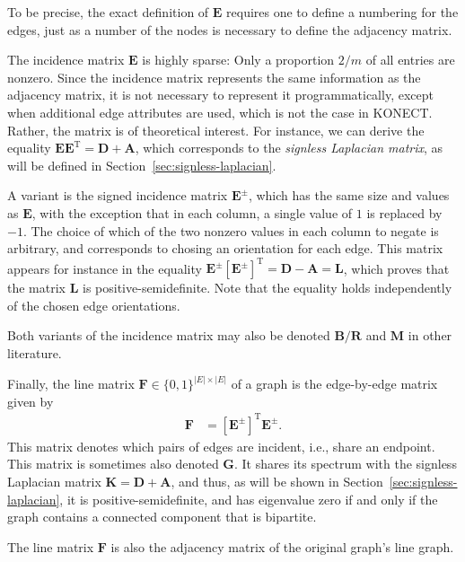 \documentclass{article}
\begin{document}
To be precise, the exact definition of $\mathbf E$ requires one to
define a numbering for the edges, just as a number of the nodes is necessary
to define the adjacency matrix. 

The incidence matrix $\mathbf E$ is highly sparse:  Only a proportion
$2/m$ of all entries are nonzero.  Since the incidence matrix represents
the same information as the adjacency matrix, it is not necessary to represent
it programmatically, except when additional edge attributes are used,
which is not the case in KONECT.  Rather, the matrix is of theoretical
interest.  For instance, we can derive the equality $\mathbf E \mathbf
E^{\mathrm T} = \mathbf D + \mathbf A$, which corresponds to the
\emph{signless Laplacian matrix}, as will be defined in
Section~\ref{sec:signless-laplacian}.  

A variant is the signed incidence matrix $\mathbf E^{\pm}$, which has
the same size and values as $\mathbf E$, with the exception that in each
column, a single value of $1$ is replaced by $-1$.  The choice of which
of the two nonzero values in each column to negate is arbitrary, and
corresponds to chosing an orientation for each edge.  
This matrix appears
for instance in the equality $\mathbf E^{\pm} [\mathbf E^{\pm}]^{\mathrm
  T} = \mathbf D - \mathbf A = \mathbf L$, which proves that the matrix
$\mathbf L$ is positive-semidefinite.  Note that the equality holds
independently of the chosen edge orientations. 

Both variants of the incidence matrix may also be denoted $\mathbf B/\mathbf R$
\cite[e.g.\ in][]{b902} and $\mathbf M$
\cite[e.g.\ in][]{b646} in other literature. 

Finally, the line matrix $\mathbf F \in \{0,1\}^{|E|\times|E|}$ of a graph is the edge-by-edge
matrix given by 
\begin{align}
  \mathbf F &= [\mathbf E^{\pm}]^{\mathrm T} \mathbf E^{\pm}.
\end{align}
This matrix denotes which pairs of edges are incident, i.e., share an
endpoint.  This matrix is sometimes also denoted $\mathbf G$.  It shares
its spectrum with the signless Laplacian matrix $\mathbf K = \mathbf D +
\mathbf A$, and thus, as will be shown in
Section~\ref{sec:signless-laplacian}, it is positive-semidefinite, and
has eigenvalue zero if and only if the graph contains a connected
component that is bipartite. 

The line matrix $\mathbf F$ is also the adjacency matrix of the original
graph's line graph. 
\end{document}
